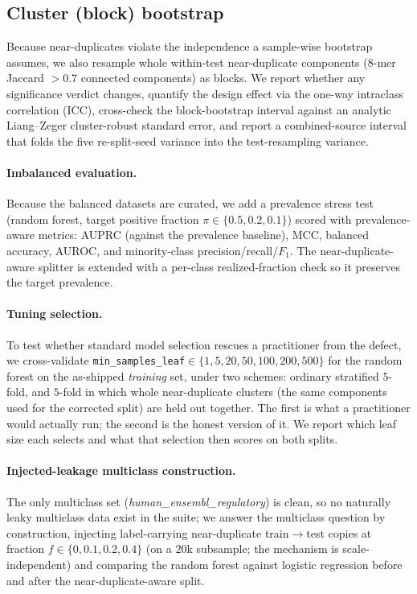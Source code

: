 \documentclass[webpdf,modern,large,namedate]{oup-authoring-template}%
\begin{document}
\subsection{Cluster (block) bootstrap}
Because near-duplicates violate the independence a sample-wise bootstrap assumes, we also resample whole within-test near-duplicate components (8-mer Jaccard $>0.7$ connected components) as blocks. We report whether any significance verdict changes, quantify the design effect via the one-way intraclass correlation (ICC), cross-check the block-bootstrap interval against an analytic Liang--Zeger cluster-robust standard error, and report a combined-source interval that folds the five re-split-seed variance into the test-resampling variance.

\paragraph{Imbalanced evaluation.}\label{sec:imbalance}
Because the balanced datasets are curated, we add a prevalence stress test (random forest, target positive fraction $\pi\in\{0.5,0.2,0.1\}$) scored with prevalence-aware metrics: AUPRC (against the prevalence baseline), MCC, balanced accuracy, AUROC, and minority-class precision/recall/$F_1$. The near-duplicate-aware splitter is extended with a per-class realized-fraction check so it preserves the target prevalence.

\paragraph{Tuning selection.}\label{sec:m-tuning}
To test whether standard model selection rescues a practitioner from the defect, we cross-validate \texttt{min\_samples\_leaf}$\in\{1,5,20,50,100,200,500\}$ for the random forest on the as-shipped \emph{training} set, under two schemes: ordinary stratified $5$-fold, and $5$-fold in which whole near-duplicate clusters (the same components used for the corrected split) are held out together. The first is what a practitioner would actually run; the second is the honest version of it. We report which leaf size each selects and what that selection then scores on both splits.

\paragraph{Injected-leakage multiclass construction.}
The only multiclass set (\textit{human\_ensembl\_regulatory}) is clean, so no naturally leaky multiclass data exist in the suite; we answer the multiclass question by construction, injecting label-carrying near-duplicate train$\to$test copies at fraction $f\in\{0,0.1,0.2,0.4\}$ (on a $20$k subsample; the mechanism is scale-independent) and comparing the random forest against logistic regression before and after the near-duplicate-aware split.
\end{document}
